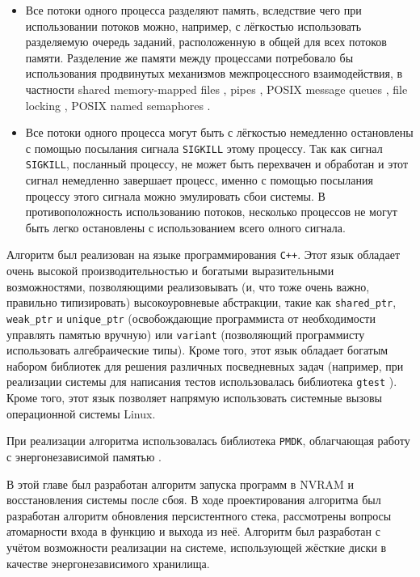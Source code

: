 \documentclass[times,specification,annotation]{itmo-student-thesis}
\begin{document}
\begin{itemize}
    \item Все потоки одного процесса разделяют память, вследствие чего при использовании потоков можно, например, с лёгкостью использовать разделяемую очередь заданий, расположенную в общей для всех потоков памяти. Разделение же памяти между процессами потребовало бы использования продвинутых механизмов межпроцессного взаимодействия, в частности shared memory-mapped files \cite{mmap}, pipes \cite{pipe}, POSIX message queues \cite{posix-mq}, file locking \cite{file-locking}, POSIX named semaphores \cite{posix-sems}.
    
    \item Все потоки одного процесса могут быть с лёгкостью немедленно остановлены с помощью посылания сигнала \texttt{SIGKILL} этому процессу. Так как сигнал \texttt{SIGKILL}, посланный процессу, не может быть перехвачен и обработан и этот сигнал немедленно завершает процесс, именно с помощью посылания процессу этого сигнала можно эмулировать сбои системы. В противоположность использованию потоков, несколько процессов не могут быть легко остановлены с использованием всего олного сигнала.
\end{itemize}

\bigbreak

Алгоритм был реализован на языке программирования \texttt{C++}. Этот язык обладает очень высокой производительностью и богатыми выразительными возможностями, позволяющими реализовывать (и, что тоже очень важно, правильно типизировать) высокоуровневые абстракции, такие как \texttt{shared\_ptr}, \texttt{weak\_ptr} и \texttt{unique\_ptr} (освобождающие программиста от необходимости управлять памятью вручную) или \texttt{variant} (позволяющий программисту использовать алгебраические типы). Кроме того, этот язык обладает богатым набором библиотек для решения различных посведневных задач (например, при реализации системы для написания тестов использовалась библиотека \texttt{gtest} \cite{gtest}). Кроме того, этот язык позволяет напрямую использовать системные вызовы операционной системы Linux.

При реализации алгоритма использовалась библиотека \texttt{PMDK}, облагчающая работу с энергонезависимой памятью \cite{pmdk}.

\chapterconclusion

В этой главе был разработан алгоритм запуска программ в NVRAM и восстановления системы после сбоя. В ходе проектирования алгоритма был разработан алгоритм обновления персистентного стека, рассмотрены вопросы атомарности входа в функцию и выхода из неё. Алгоритм был разработан с учётом возможности реализации на системе, использующей жёсткие диски в качестве энергонезависимого хранилища.
\end{document}
